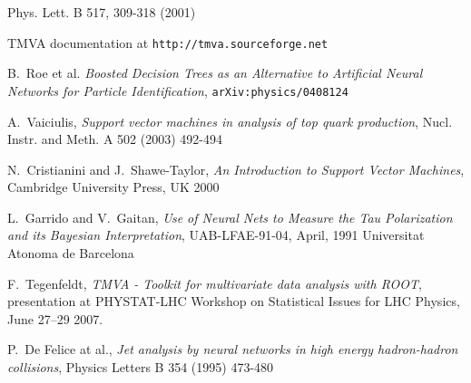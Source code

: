 \documentclass[a4paper]{jpconf}
\begin{document}
\begin{thebibliography}{9}
 Phys. Lett. B 517, 309-318 (2001)

 TMVA documentation at {\tt http://tmva.sourceforge.net}

 B.~Roe et al. \emph{Boosted Decision Trees as an 
Alternative to Artificial Neural Networks for Particle Identification},
{\tt arXiv:physics/0408124}

 A.~Vaiciulis, \emph{Support vector machines in analysis of top quark production},
Nucl. Instr. and Meth. A 502 (2003) 492-494

N.~Cristianini and J.~Shawe-Taylor, \emph{An Introduction to Support Vector Machines},
Cambridge University Press, UK 2000

 L.~Garrido and V.~Gaitan, 
\emph{Use of Neural Nets to Measure the Tau Polarization and its Bayesian Interpretation},
UAB-LFAE-91-04, April, 1991 Universitat Atonoma de Barcelona

 F.~Tegenfeldt, \emph{TMVA - Toolkit for multivariate
data analysis with ROOT}, presentation at PHYSTAT-LHC Workshop on
Statistical Issues for LHC Physics, June 27--29 2007.

 P.~De Felice at al., 
\emph{Jet analysis by neural networks in high energy hadron-hadron collisions},
Physics Letters B 354 (1995) 473-480



\end{thebibliography}
\end{document}
